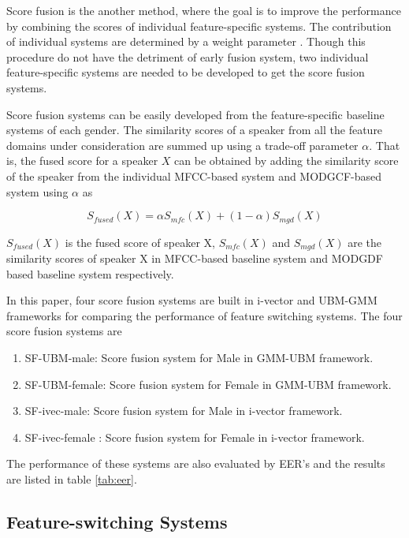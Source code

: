 \documentclass{article}
\begin{document}
	Score fusion is the another method, where the goal is to improve the performance by combining the scores of individual feature-specific systems. The contribution of individual systems are determined by a weight parameter \cite{scoreFusion}. Though this procedure do not have the detriment of early fusion system, two individual feature-specific systems are needed to be developed to get the score fusion systems.
	 
	Score fusion systems can be easily developed from the feature-specific baseline systems of each gender. The similarity scores of a speaker from all the feature domains under consideration are summed up using a trade-off parameter $\alpha$. That is, the fused score for a speaker $X$ can be obtained by adding the similarity score of the speaker from the individual MFCC-based system and MODGCF-based system using $\alpha$ as 
	
	\begin{equation}
	 S_{fused}\left( X \right) = \alpha S_{mfc}\left( X \right) + (1-\alpha)S_{mgd}\left( X \right)
	\label{eq:scoreFuse}
	\end{equation}
	
	$S_{fused}\left( X \right)$ is the fused score of speaker X,  $S_{mfc}\left( X \right)$ and $S_{mgd}\left( X \right)$ are the similarity scores of speaker X in MFCC-based baseline system and MODGDF based baseline system respectively.
	
	 
	In this paper, four score fusion systems are built in i-vector and UBM-GMM frameworks for comparing the performance of feature switching systems. The four score fusion systems are
	\begin{enumerate}
	\item SF-UBM-male: Score fusion system for Male in GMM-UBM framework.
	\item SF-UBM-female: Score fusion system for Female in GMM-UBM framework.
	\item SF-ivec-male: Score fusion system for Male in i-vector framework.
	\item SF-ivec-female	: Score fusion system for Female in i-vector framework.
	\end{enumerate}
	The performance of these systems are also evaluated by EER's and the results are listed in table \ref{tab:eer}.

\subsection{Feature-switching Systems}
\label{subsec:featSwitch}
\end{document}
